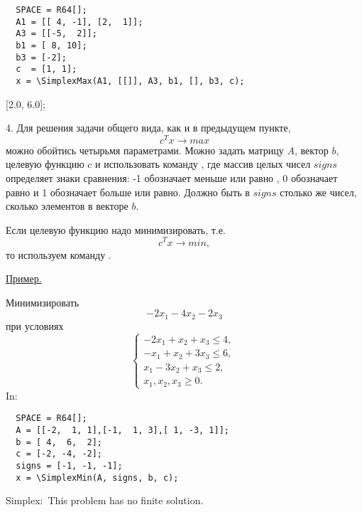 \begin{verbatim}
  SPACE = R64[];
  A1 = [[ 4, -1], [2,  1]];
  A3 = [[-5,  2]];
  b1 = [ 8, 10];
  b3 = [-2];
  c  = [1, 1];
  x = \SimplexMax(A1, [[]], A3, b1, [], b3, c);
\end{verbatim}
\ex{}
{[2.0, 6.0];}

4. Для решения   задачи общего вида, как и в предыдущем пункте,
$$c^Tx \rightarrow max$$ можно обойтись четырьмя параметрами.
Можно задать матрицу $A$, вектор  $b$, целевую функцию $c$  и
использовать команду , где
массив целых чисел $signs$ определяет знаки сравнения:
        -1  обозначает меньше или равно , 0 обозначает равно  и 1  обозначает больше или равно.
Должно быть в $signs$ столько же чисел, сколько элементов в векторе $b$.

Если целевую функцию надо минимизировать, т.е. $$c^Tx \rightarrow min,$$ то используем команду .

\underline{%
Пример.%
}

 Минимизировать $$-2x_1-4x_2-2x_3$$
при условиях
$$%
  \left\{
  \begin{array}{c}%
  -2x_1 +  x_2 +  x_3 \leqslant 4,\ \\
  - x_1 +  x_2 + 3x_3 \leqslant 6,\ \\
    x_1 - 3x_2 +  x_3 \leqslant 2,\ \\
    x_1,   x_2,   x_3 \geqslant 0.%
  \end{array}
  \right.%
$$
In:
\begin{verbatim}
  SPACE = R64[];
  A = [[-2,  1, 1],[-1,  1, 3],[ 1, -3, 1]];   
  b = [ 4,  6,  2];
  c = [-2, -4, -2]; 
  signs = [-1, -1, -1];
  x = \SimplexMin(A, signs, b, c);
\end{verbatim}
\ex{}
{ Simplex:\ This problem has no finite solution.}



